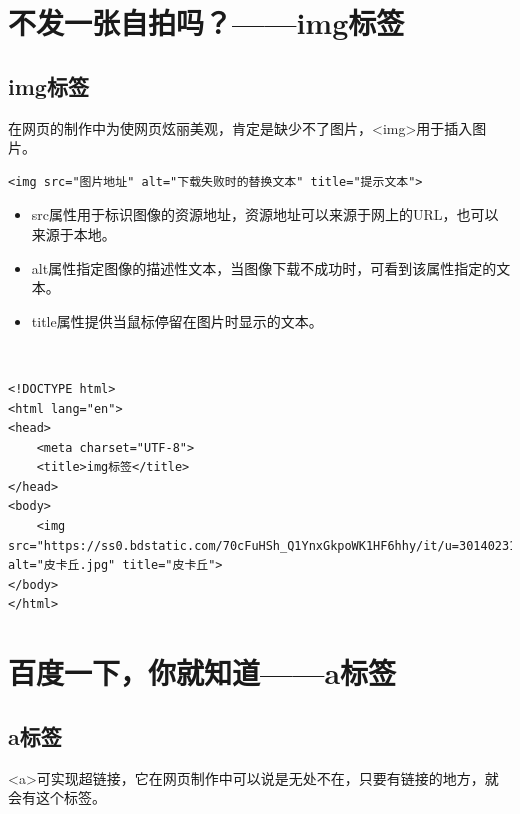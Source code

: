 \newpage

\section{不发一张自拍吗？——img标签}

\subsection{img标签}

在网页的制作中为使网页炫丽美观，肯定是缺少不了图片，<img>用于插入图片。 \\

\begin{lstlisting}[style=htmlcssjs]
<img src="图片地址" alt="下载失败时的替换文本" title="提示文本">
\end{lstlisting}

\begin{itemize}
	\item src属性用于标识图像的资源地址，资源地址可以来源于网上的URL，也可以来源于本地。

	\item alt属性指定图像的描述性文本，当图像下载不成功时，可看到该属性指定的文本。

	\item title属性提供当鼠标停留在图片时显示的文本。
\end{itemize}

 \\
\begin{lstlisting}[style=htmlcssjs, breaklines=true, breakatwhitespace=false]
<!DOCTYPE html>
<html lang="en">
<head>
    <meta charset="UTF-8">
    <title>img标签</title>
</head>
<body>
    <img src="https://ss0.bdstatic.com/70cFuHSh_Q1YnxGkpoWK1HF6hhy/it/u=3014023147,616635741&fm=26&gp=0.jpg" alt="皮卡丘.jpg" title="皮卡丘">
</body>
</html>
\end{lstlisting}

\newpage

\section{百度一下，你就知道——a标签}

\subsection{a标签}

<a>可实现超链接，它在网页制作中可以说是无处不在，只要有链接的地方，就会有这个标签。 \\

